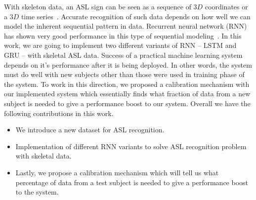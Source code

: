 \documentclass[10pt,twocolumn,letterpaper]{article}
\begin{document}
With skeleton data, an ASL sign can be seen as a sequence of $3D$ coordinates or a $3D$ time series~\cite{7298714}. Accurate recognition of such data depends on how well we can model the inherent sequential pattern in data. Recurrent neural network (RNN) has shown very good performance in this type of sequential modeling~\cite{DBLP:journals/corr/Lipton15}. In this work, we are going to implement two different variants of RNN -- LSTM and GRU -- with skeletal ASL data. Success of a practical machine learning system depends on it's performance after it is being deployed. In other words, the system must do well with new subjects other than those were used in training phase of the system. To work in this direction, we proposed a calibration mechanism with our implemented system which essentially finds what fraction of data from a new subject is needed to give a performance boost to our system. Overall we have the following contributions in this work.
\begin{itemize}  
	\item We introduce a new dataset for ASL recognition.
	\item Implementation of different RNN variants to solve ASL recognition problem with skeletal data.
	\item Lastly, we propose a calibration mechanism which will tell us what percentage of data from a test subject is needed to give a performance boost to the system.
\end{itemize}
\end{document}
